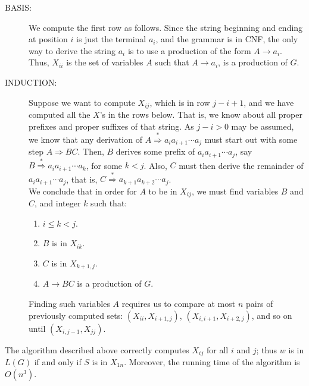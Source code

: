 \documentclass[]{article}
\begin{document}
      \begin{description}
        \item[BASIS:] We compute the first row as follows. Since the string
        beginning and ending at position $i$ is just the terminal $a_i$, and the
        grammar is in CNF, the only way to derive the string $a_i$ is to use a
        production of the form $A \rightarrow a_i$. Thus, $X_{ii}$ is the set of
        variables $A$ such that $A \rightarrow a_i$, is a production of $G$.
        \item[INDUCTION:] Suppose we want to compute $X_{ij}$, which is in row
        $j - i + 1$, and we have computed all the $X$'s in the rows below. That
        is, we know about all proper prefixes and proper suffixes of that
        string. As $j - i > 0$ may be assumed, we know that any derivation of
        $A \overset{*}{\Rightarrow} a_ia_{i+1}\cdots a_j$ must start out with
        some step $A \Rightarrow BC$. Then, $B$ derives some prefix of
        $a_ia_{i+ 1}\cdots a_j$, say
        $B \overset{*}{\Rightarrow} a_ia_{i + 1}\cdots a_k$, for some $k < j$.
        Also, $C$ must then derive the remainder of $a_ia_{i+1}\cdots a_j$, that
        is, $C \overset{*}{\Rightarrow} a_{k+1}a_{k+2}\cdots a_j$. \\
        We conclude that in order for $A$ to be in $X_{ij}$, we must find
        variables $B$ and $C$, and integer $k$ such that:
          \begin{enumerate}
            \item $i \leq k < j$.
            \item $B$ is in $X_{ik}$.
            \item $C$ is in $X_{k+ 1, j}$.
            \item $A \rightarrow BC$ is a production of $G$.
          \end{enumerate}
        Finding such variables $A$ requires us to compare at most $n$ pairs of
        previously computed sets: $(X_{ii},X_{i+1,j})$, $(X_{i,i+1},X_{i+2,j})$,
        and so on until $(X_{i,j-1},X_{jj})$.
      \end{description}
      \begin{thm}
        The algorithm described above correctly computes $X_{ij}$ for all $i$
        and $j$; thus $w$ is in $L(G)$ if and only if $S$ is in $X_{1n}$.
        Moreover, the running time of the algorithm is $O(n^3)$.
      \end{thm}
\end{document}
